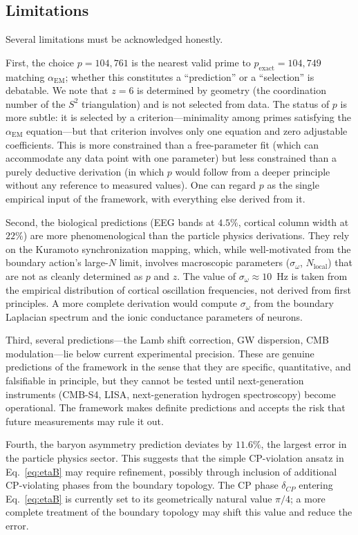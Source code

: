 \documentclass[aps,prd,twocolumn,superscriptaddress,longbibliography,nofootinbib]{revtex4-2}
\newcommand{\Stwo}{S^2}
\newcommand{\alphaEM}{\alpha_{\mathrm{EM}}}
\begin{document}
\subsection{Limitations}

Several limitations must be acknowledged honestly.

First, the choice $p = 104{,}761$ is the nearest valid prime to
$p_\text{exact}=104{,}749$ matching
$\alphaEM$; whether this constitutes a ``prediction'' or a
``selection'' is debatable.  We note that $z = 6$ is determined by
geometry (the coordination number of the $\Stwo$ triangulation) and
is not selected from data.  The status of $p$ is more subtle: it is
selected by a criterion---minimality among primes satisfying the
$\alphaEM$ equation---but that criterion involves only one equation
and zero adjustable coefficients.  This is more constrained than a
free-parameter fit (which can accommodate any data point with one
parameter) but less constrained than a purely deductive derivation
(in which $p$ would follow from a deeper principle without any
reference to measured values).  One can regard $p$ as the single
empirical input of the framework, with everything else derived from
it.

Second, the biological predictions (EEG bands at $4.5\%$, cortical
column width at $22\%$) are more phenomenological than the particle
physics derivations.  They rely on the Kuramoto synchronization
mapping, which, while well-motivated from the boundary action's
large-$N$ limit, involves macroscopic parameters
($\sigma_\omega$, $N_{\mathrm{local}}$) that are not as cleanly
determined as $p$ and $z$.  The value of $\sigma_\omega \approx 10$~Hz
is taken from the empirical distribution of cortical oscillation
frequencies, not derived from first principles.  A more complete
derivation would compute $\sigma_\omega$ from the boundary Laplacian
spectrum and the ionic conductance parameters of neurons.

Third, several predictions---the Lamb shift correction, GW
dispersion, CMB modulation---lie below current experimental
precision.  These are genuine predictions of the framework in the
sense that they are specific, quantitative, and falsifiable in
principle, but they cannot be tested until next-generation
instruments (CMB-S4, LISA, next-generation hydrogen spectroscopy)
become operational.  The framework makes definite predictions and
accepts the risk that future measurements may rule it out.

Fourth, the baryon asymmetry prediction deviates by $11.6\%$,
the largest error in the particle physics sector.  This suggests
that the simple CP-violation ansatz in
Eq.~\eqref{eq:etaB} may require refinement, possibly through
inclusion of additional CP-violating phases from the boundary
topology.  The CP phase $\delta_{CP}$ entering
Eq.~\eqref{eq:etaB} is currently set to its geometrically natural
value $\pi/4$; a more complete treatment of the boundary topology
may shift this value and reduce the error.
\end{document}
